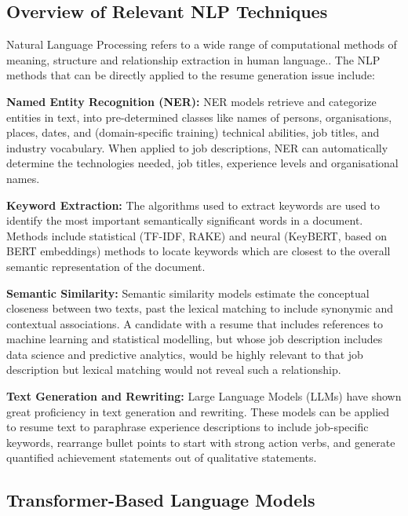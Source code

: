\documentclass[12pt, a4paper, oneside]{report}
\begin{document}
\subsection{Overview of Relevant NLP Techniques}

Natural Language Processing refers to a wide range of computational methods of meaning, structure and relationship extraction in human language.\cite{vaswani2017}. The NLP methods that can be directly applied to the resume generation issue include:

\textbf{Named Entity Recognition (NER):} NER models retrieve and categorize entities in text, into pre-determined classes like names of persons, organisations, places, dates, and (domain-specific training) technical abilities, job titles, and industry vocabulary. When applied to job descriptions, NER can automatically determine the technologies needed, job titles, experience levels and organisational names.

\textbf{Keyword Extraction:} The algorithms used to extract keywords are used to identify the most important semantically significant words in a document. Methods include statistical (TF-IDF, RAKE) and neural (KeyBERT, based on BERT embeddings) methods to locate keywords which are closest to the overall semantic representation of the document\cite{devlin2019}.

\textbf{Semantic Similarity:} Semantic similarity models estimate the conceptual closeness between two texts, past the lexical matching to include synonymic and contextual associations\cite{shen2018}. A candidate with a resume that includes references to machine learning and statistical modelling, but whose job description includes data science and predictive analytics, would be highly relevant to that job description but lexical matching would not reveal such a relationship.

\textbf{Text Generation and Rewriting:} Large Language Models (LLMs) have shown great proficiency in text generation and rewriting\cite{brown2020}. These models can be applied to resume text to paraphrase experience descriptions to include job-specific keywords, rearrange bullet points to start with strong action verbs, and generate quantified achievement statements out of qualitative statements.

\subsection{Transformer-Based Language Models}
\end{document}
